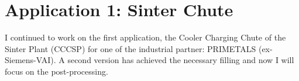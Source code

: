 
\section{Application 1: Sinter Chute}
\label{sec:application1sinterchute}

I continued to work on the first application, the Cooler Charging Chute of the
Sinter Plant (CCCSP) for one of the industrial partner: PRIMETALS
(ex-Siemens-VAI).
A second version has achieved the necessary filling and now I will focus on the
post-processing.



